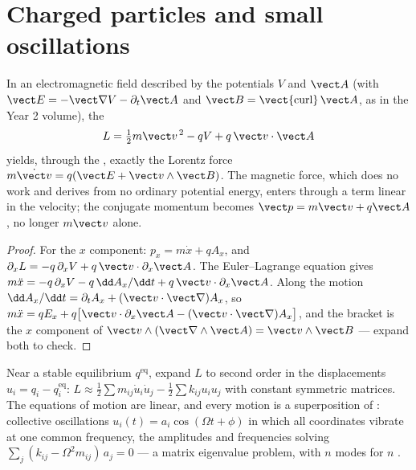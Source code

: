 \section{Charged particles and small oscillations}

\begin{proposition}\label{prop:b3:lagrangian-mechanics:charge}
In an electromagnetic field described by the potentials $V$ and
$\vect A$ (with $\vect E = -\vect\nabla V - \partial_t\vect A$ and
$\vect B = \operatorname{\vect{curl}}\vect A$, as in the Year 2
volume), the 
\[
L = \tfrac12 m\vect v^{\,2} - qV + q\,\vect v\cdot\vect A
\]
yields, through the , exactly the Lorentz
force $m\dot{\vect v} = q(\vect E + \vect v\wedge\vect B)$. The
magnetic force, which does no work and derives from no ordinary
potential energy, enters through a term linear in the velocity; the
conjugate momentum becomes $\vect p = m\vect v + q\vect A$, no longer
$m\vect v$ alone.
\end{proposition}

\begin{proof}
For the $x$ component: $p_x = m\dot x + qA_x$, and
$\partial_xL = -q\,\partial_xV + q\,\vect v\cdot\partial_x\vect A$. The
Euler--Lagrange equation gives $m\ddot x = -q\,\partial_xV -
q\,\dd A_x/\dd t + q\,\vect v\cdot\partial_x\vect A$. Along the motion
$\dd A_x/\dd t = \partial_tA_x + (\vect v\cdot\vect\nabla)A_x$, so
$m\ddot x = qE_x + q\big[\vect v\cdot\partial_x\vect A - (\vect v\cdot
\vect\nabla)A_x\big]$, and the bracket is the $x$ component of $\vect
v\wedge(\vect\nabla\wedge\vect A) = \vect v\wedge\vect B$ --- expand
both to check.
\end{proof}

\begin{proposition}\label{prop:b3:lagrangian-mechanics:modes}
Near a stable equilibrium $q^{\text{eq}}$, expand $L$ to second order
in the displacements $u_i = q_i - q_i^{\text{eq}}$:
$L \approx \tfrac12\sum m_{ij}\dot u_i\dot u_j -
\tfrac12\sum k_{ij}u_iu_j$ with constant symmetric matrices. The
equations of motion are linear, and every motion is a superposition of
\emph{}: collective oscillations $u_i(t) = a_i\cos(\Omega t
+ \phi)$ in which all coordinates vibrate at one common frequency, the
amplitudes and frequencies solving $\sum_j(k_{ij} -
\Omega^2m_{ij})\,a_j = 0$ --- a matrix eigenvalue problem, with $n$
modes for $n$ .
\end{proposition}

